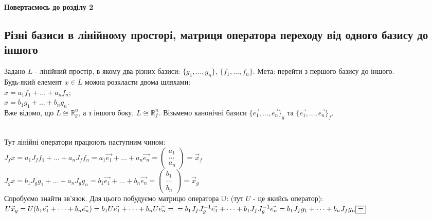 \documentclass[a4paper, 10pt]{article}
\theoremstyle{theoremdd}
\theoremstyle{theoremdd}
\theoremstyle{theoremdd}
\theoremstyle{theoremdd}
\theoremstyle{theoremdd}
\theoremstyle{theoremdd}
\theoremstyle{theoremdd}
\theoremstyle{theoremdd}
\begin{document}
\textbf{Повертаємось до розділу 2}
\newpage
{}
\setcounter{section}{2}
\setcounter{subsection}{10}
\subsection{Різні базиси в лінійному просторі, матриця оператора переходу від одного базису до іншого}
Задано $L$ - лінійний простір, в якому два різних базиси: $\{g_1,
\dots,g_n\}$, $\{f_1,\dots,f_n\}$. Мета: перейти з першого базису до іншого.\\
Будь-який елемент $x \in L$ можна розкласти двома шляхами:\\
$x = a_1 f_1 + \dots + a_n f_n$;\\
$x = b_1 g_1 + \dots + b_n g_n$.\\
Вже відомо, що $L \cong \mathbb{R}^n_g$, а з іншого боку, $L \cong \mathbb{R}^n_f$. Візьмемо канонічні базиси $\{\vec{e_1},\dots, \vec{e_n}\}_g$ та $\{\vec{e_1},\dots, \vec{e_n}\}_f$.
\\
\\
Тут лінійні оператори працюють наступним чином:\\
$J_f x = a_1 J_f f_1 + \dots + a_n J_f f_n = a_1 \vec{e_1} + \dots + a_n \vec{e_n} = \begin{pmatrix}
a_1 \\ \dots \\ a_n
\end{pmatrix} = \vec{x}_f$\\
$J_g x = b_1 J_g g_1 + \dots + a_n J_g g_n = b_1 \vec{e_1} + \dots + b_n \vec{e_n} = \begin{pmatrix}
b_1 \\ \dots \\ b_n
\end{pmatrix} = \vec{x}_g $\\
Спробуємо знайти зв'язок. Для цього побудуємо матрицю оператора $\mathbb{U}$: (тут $U$ - це якийсь оператор):\\
$U \vec{x}_g = U(b_1 \vec{e_1} + \dots + b_n \vec{e_n}) = b_1 U\vec{e_1} + \dots + b_n U\vec{e_n} = \\ = b_1 J_f J_g^{-1} \vec{e_1} + \dots + b_1 J_f J_g^{-1} \vec{e_n} = b_1 J_f g_1 + \dots + b_n J_f g_n \boxed{=} $\\
\end{document}
